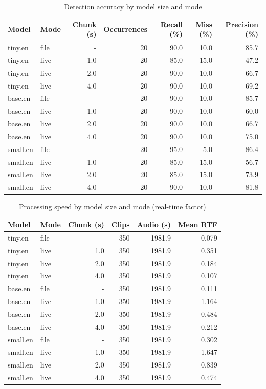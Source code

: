 \begin{table}[h]
\caption{Detection accuracy by model size and mode}
\label{table:accuracy}
\centering
\begin{tabular}{ |l|l|r|r|r|r|r| }
 \hline
 Model & Mode & Chunk (s) & Occurrences & Recall (\%) & Miss (\%) & Precision (\%) \\
 \hline
 tiny.en & file & - & 20 & 90.0 & 10.0 & 85.7 \\
 tiny.en & live & 1.0 & 20 & 85.0 & 15.0 & 47.2 \\
 tiny.en & live & 2.0 & 20 & 90.0 & 10.0 & 66.7 \\
 tiny.en & live & 4.0 & 20 & 90.0 & 10.0 & 69.2 \\
 base.en & file & - & 20 & 90.0 & 10.0 & 85.7 \\
 base.en & live & 1.0 & 20 & 90.0 & 10.0 & 60.0 \\
 base.en & live & 2.0 & 20 & 90.0 & 10.0 & 66.7 \\
 base.en & live & 4.0 & 20 & 90.0 & 10.0 & 75.0 \\
 small.en & file & - & 20 & 95.0 & 5.0 & 86.4 \\
 small.en & live & 1.0 & 20 & 85.0 & 15.0 & 56.7 \\
 small.en & live & 2.0 & 20 & 85.0 & 15.0 & 73.9 \\
 small.en & live & 4.0 & 20 & 90.0 & 10.0 & 81.8 \\
 \hline
\end{tabular}
\end{table}

\begin{table}[h]
\caption{Processing speed by model size and mode (real-time factor)}
\label{table:speed}
\centering
\begin{tabular}{ |l|l|r|r|r|r| }
 \hline
 Model & Mode & Chunk (s) & Clips & Audio (s) & Mean RTF \\
 \hline
 tiny.en & file & - & 350 & 1981.9 & 0.079 \\
 tiny.en & live & 1.0 & 350 & 1981.9 & 0.351 \\
 tiny.en & live & 2.0 & 350 & 1981.9 & 0.184 \\
 tiny.en & live & 4.0 & 350 & 1981.9 & 0.107 \\
 base.en & file & - & 350 & 1981.9 & 0.111 \\
 base.en & live & 1.0 & 350 & 1981.9 & 1.164 \\
 base.en & live & 2.0 & 350 & 1981.9 & 0.484 \\
 base.en & live & 4.0 & 350 & 1981.9 & 0.212 \\
 small.en & file & - & 350 & 1981.9 & 0.302 \\
 small.en & live & 1.0 & 350 & 1981.9 & 1.647 \\
 small.en & live & 2.0 & 350 & 1981.9 & 0.839 \\
 small.en & live & 4.0 & 350 & 1981.9 & 0.474 \\
 \hline
\end{tabular}
\end{table}
